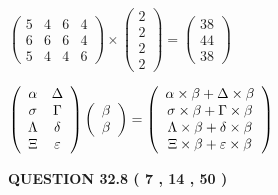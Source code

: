 \documentclass[12pt]{article}
\begin{document}
 
$\left( \begin{array}{ccccccccccccccc}
           5  & 
           4  & 
           6  & 
           4  \\ 
           6  & 
           6  & 
           6  & 
           4  \\ 
           5  & 
           4  & 
           4  & 
           6
\end{array}\right) \times
\left( \begin{array}{c}
           2  \\ 
           2  \\ 
           2  \\ 
           2
\end{array}\right)  =
\left( \begin{array}{c}
          38  \\ 
          44  \\ 
          38
\end{array}\right)  $
 
$  %
 \left( \begin{array}
 {
 c
 c
 }
 \alpha & 
 \Delta \\ 
 \sigma & 
 \Gamma \\ 
 \Lambda & 
 \delta \\ 
                    \Xi & 
 \varepsilon
 \end{array} \right)
 \left( \begin{array}
 {
 c
 }
 \beta \\ 
 \beta
 \end{array} \right)
=
 \left( \begin{array}
 {
 c
 }
  \alpha \times  \beta +  \Delta \times  \beta \\ 
  \sigma \times  \beta +  \Gamma \times  \beta \\ 
  \Lambda \times  \beta +  \delta \times  \beta \\ 
                     \Xi \times  \beta +  \varepsilon \times  \beta
 \end{array} \right)
$
 
 
 
 
 
\noindent{}

 
 
  
\vspace{0.2in}
  
{\textbf{\Large{QUESTION
32.8 
 (           7 ,          14 ,          50 )
}}}
  
\end{document}
